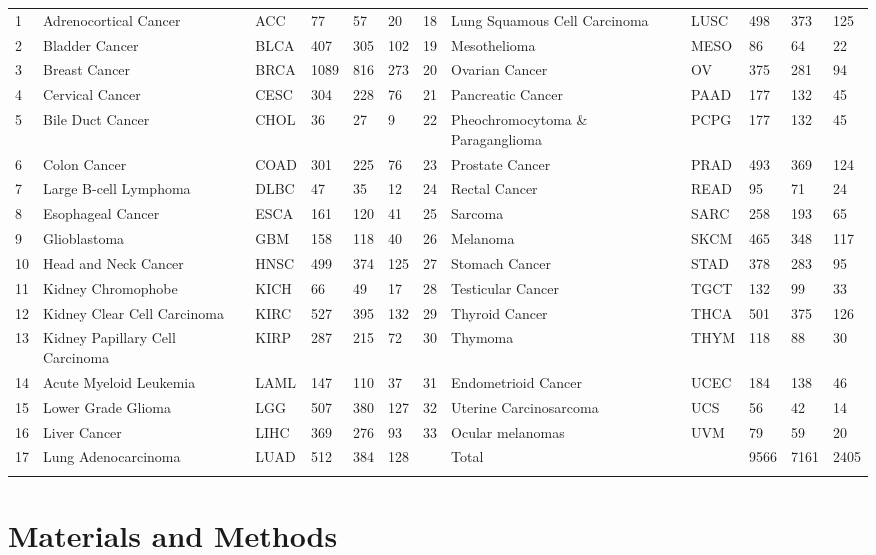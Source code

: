 \documentclass{bioinfo}
\begin{document}
\begin{table}[h!]
{\begin{tabular}{@{}llllll|llllll@{}}
1	&	Adrenocortical Cancer	&	ACC	&	77	&	57	&	20	&	18	&	Lung Squamous Cell Carcinoma	&	LUSC	&	498	&	373	&	125	\\
2	&	Bladder Cancer	&	BLCA	&	407	&	305	&	102	&	19	&	Mesothelioma	&	MESO	&	86	&	64	&	22	\\
3	&	Breast Cancer	&	BRCA	&	1089	&	816	&	273	&	20	&	Ovarian Cancer	&	OV	&	375	&	281	&	94	\\
4	&	Cervical Cancer	&	CESC	&	304	&	228	&	76	&	21	&	Pancreatic Cancer	&	PAAD	&	177	&	132	&	45	\\
5	&	Bile Duct Cancer	&	CHOL	&	36	&	27	&	9	&	22	&	Pheochromocytoma \& Paraganglioma	&	PCPG	&	177	&	132	&	45	\\
6	&	Colon Cancer	&	COAD	&	301	&	225	&	76	&	23	&	Prostate Cancer	&	PRAD	&	493	&	369	&	124	\\
7	&	Large B-cell Lymphoma	&	DLBC	&	47	&	35	&	12	&	24	&	Rectal Cancer	&	READ	&	95	&	71	&	24	\\
8	&	Esophageal Cancer	&	ESCA	&	161	&	120	&	41	&	25	&	Sarcoma	&	SARC	&	258	&	193	&	65	\\
9	&	Glioblastoma	&	GBM	&	158	&	118	&	40	&	26	&	Melanoma	&	SKCM	&	465	&	348	&	117	\\
10	&	Head and Neck Cancer	&	HNSC	&	499	&	374	&	125	&	27	&	Stomach Cancer	&	STAD	&	378	&	283	&	95	\\
11	&	Kidney Chromophobe	&	KICH	&	66	&	49	&	17	&	28	&	Testicular Cancer	&	TGCT	&	132	&	99	&	33	\\
12	&	Kidney Clear Cell Carcinoma	&	KIRC	&	527	&	395	&	132	&	29	&	Thyroid Cancer	&	THCA	&	501	&	375	&	126	\\
13	&	Kidney Papillary Cell Carcinoma	&	KIRP	&	287	&	215	&	72	&	30	&	Thymoma	&	THYM	&	118	&	88	&	30	\\
14	&	Acute Myeloid Leukemia	&	LAML	&	147	&	110	&	37	&	31	&	Endometrioid Cancer	&	UCEC	&	184	&	138	&	46	\\
15	&	Lower Grade Glioma	&	LGG	&	507	&	380	&	127	&	32	&	Uterine Carcinosarcoma	&	UCS	&	56	&	42	&	14	\\
16	&	Liver Cancer	&	LIHC	&	369	&	276	&	93	&	33	&	Ocular melanomas	&	UVM	&	79	&	59	&	20	\\
17	&	Lung Adenocarcinoma	&	LUAD	&	512	&	384	&	128	&		&	Total	&		&	9566	&	7161	&	2405\\\botrule
\end{tabular}}{}
\end{table}


\section{Materials and Methods}
\end{document}
